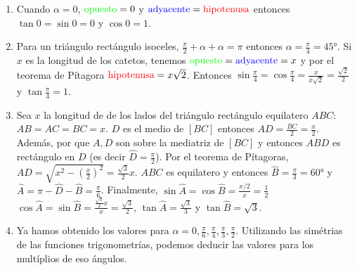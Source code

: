 \begin{enumerate}
\item Cuando $\alpha=0$, ${\color{green}{\text{opuesto}}} = 0$ y
  ${\color{blue}{\text{adyacente}}} = \text{\color{red}{\text{hipotenusa}}}$
  entonces ${\tan 0} = {\sin 0} = 0$ y $\cos 0 = 1$.
\item Para un triángulo rectángulo isoceles, $\frac{\pi}{2} + \alpha + \alpha = \pi$ entonces $\alpha = \frac{\pi}{4} = 45°$. Si $x$ es la longitud de los catetos, tenemos ${\color{green}{\text{opuesto}}} = {\color{blue}{\text{adyacente}}} = x$ y por el teorema de Pítagora $\text{\color{red}{\text{hipotenusa}}} = 
x \sqrt{2} $. Entonces $\sin \frac{\pi}{4} = \cos \frac{\pi}{4} = \frac{x}{x \sqrt{2}} = \frac{\sqrt{2}}{2}$ y $\tan \frac{\pi}{4} = 1$.
\item Sea $x$ la longitud de de los lados del triángulo rectángulo equilatero
  $ABC$: ${AB} = {AC} = {BC} = x$.
  $D$ es el medio de $[BC]$ entonces ${AD} = \frac{BC}{2} = \frac{x}{2}$.
  Además, por que $A, D$ son sobre la mediatriz de $[BC]$ y entonces
  $ABD$ es rectángulo en $D$ (es decir $\widehat{D} = \frac{\pi}{2}$).
  Por el teorema de Pítagoras, 
  $AD = \sqrt{x^2 - \left(\frac{x}{2}\right)^2} = \frac{\sqrt{3}}{2} x$.
  $ABC$ es equilatero y entonces $\widehat{B} = \frac{\pi}{3} = 60°$ y
  $\widehat{A} = \pi - \widehat{D} - \widehat{B} = \frac{\pi}{6}$.
  Finalmente, 
  $\sin \widehat{A} = \cos \widehat{B} = \frac{x/2}{x} = \frac{1}{2}$
  $\cos \widehat{A} = \sin \widehat{B} = \frac{\frac{\sqrt{3}}{2} x}{x} =
  \frac{\sqrt{3}}{2}$,
  $\tan \widehat{A} = \frac{\sqrt{3}}{3}$ y
  $\tan \widehat{B} = \sqrt{3}$.
\item Ya hamos obtenido los valores para $\alpha = 0, \frac{\pi}{6}, \frac{\pi}{4}, \frac{\pi}{3}, \frac{\pi}{2}$. Utilizando las simétrias de las funciones
  trigonometrías, podemos deducir las valores para los multíplios de eso
  ángulos.


\end{enumerate}
